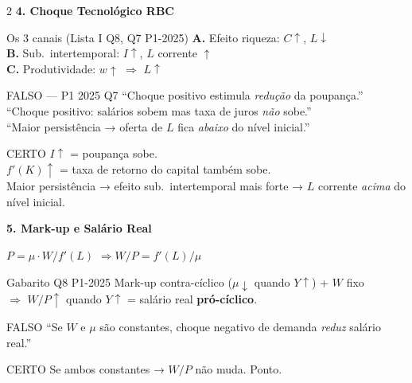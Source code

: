 \documentclass[10pt, a4paper]{article}
\begin{document}
\begin{multicols}{2}
\columnbreak
\textbf{\color{azul}\large 4. Choque Tecnológico RBC}

\begin{certobox}{Os 3 canais (Lista I Q8, Q7 P1-2025)}
\textbf{A.} Efeito riqueza: $C\uparrow$, $L\downarrow$\\
\textbf{B.} Sub.\ intertemporal: $I\uparrow$, $L$ corrente $\uparrow$\\
\textbf{C.} Produtividade: $w\uparrow$ $\Rightarrow$ $L\uparrow$
\end{certobox}

\begin{errobox}{FALSO — P1 2025 Q7}
``Choque positivo estimula \emph{redução} da poupança.''\\
``Choque positivo: salários sobem mas taxa de juros \emph{não} sobe.''\\
``Maior persistência → oferta de $L$ fica \emph{abaixo} do nível inicial.''
\end{errobox}
\vspace{0.3em}
\begin{certobox}{CERTO}
$I\uparrow$ = poupança sobe.\\
$f'(K)\uparrow$ = taxa de retorno do capital também sobe.\\
Maior persistência → efeito sub.\ intertemporal mais forte → $L$ corrente \emph{acima} do nível inicial.
\end{certobox}

\vspace{0.5em}
\textbf{\color{azul}\large 5. Mark-up e Salário Real}

\begin{formulabox}
$P = \mu \cdot W/f'(L)$ \quad$\Rightarrow$\quad $W/P = f'(L)/\mu$
\end{formulabox}

\begin{certobox}{Gabarito Q8 P1-2025}
Mark-up contra-cíclico ($\mu\downarrow$ quando $Y\uparrow$) + $W$ fixo\\
$\Rightarrow$ $W/P\uparrow$ quando $Y\uparrow$ = salário real \textbf{pró-cíclico}.
\end{certobox}

\begin{errobox}{FALSO}
``Se $W$ e $\mu$ são constantes, choque negativo de demanda \emph{reduz} salário real.''
\end{errobox}
\vspace{0.3em}
\begin{certobox}{CERTO}
Se ambos constantes → $W/P$ não muda. Ponto.
\end{certobox}


\end{multicols}
\end{document}
